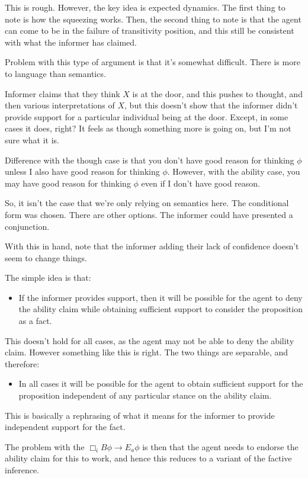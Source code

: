 \documentclass[10pt]{article}
\newcommand{\hozlinedash}[0]{%
  \noindent\hdashrule[0.5ex][c]{\textwidth}{.1pt}{2.5pt}
}
\begin{document}
\begin{note}
This is rough.
However, the key idea is expected dynamics.
The first thing to note is how the squeezing works.
Then, the second thing to note is that the agent can come to be in the failure of transitivity position, and this still be consistent with what the informer has claimed.

Problem with this type of argument is that it's somewhat difficult.
There is more to language than semantics.

Informer claims that they think \(X\) is at the door, and this pushes to thought, and then various interpretations of \(X\), but this doesn't show that the informer didn't provide support for a particular individual being at the door.
Except, in some cases it does, right?
It feels as though something more is going on, but I'm not sure what it is.

Difference with the though case is that you don't have good reason for thinking \(\phi\) unless I also have good reason for thinking \(\phi\).
However, with the ability case, you may have good reason for thinking \(\phi\) even if I don't have good reason.

So, it isn't the case that we're only relying on semantics here.
The conditional form was chosen.
There are other options.
The informer could have presented a conjunction.

With this in hand, note that the informer adding their lack of confidence doesn't seem to change things.
\end{note}


\hozlinedash

\begin{note}
  The simple idea is that:
  \begin{itemize}
  \item If the informer provides support, then it will be possible for the agent to deny the ability claim while obtaining sufficient support to consider the proposition as a fact.
  \end{itemize}
  This doesn't hold for all cases, as the agent may not be able to deny the ability claim.
  However something like this is right.
  The two things are separable, and therefore:
  \begin{itemize}
  \item In all cases it will be possible for the agent to obtain sufficient support for the proposition independent of any particular stance on the ability claim.
  \end{itemize}
  This is basically a rephrasing of what it means for the informer to provide independent support for the fact.

  The problem with the \(\Box_{i} B \phi \rightarrow E_{a}\phi\) is then that the agent needs to endorse the ability claim for this to work, and hence this reduces to a variant of the factive inference.
\end{note}
\end{document}
